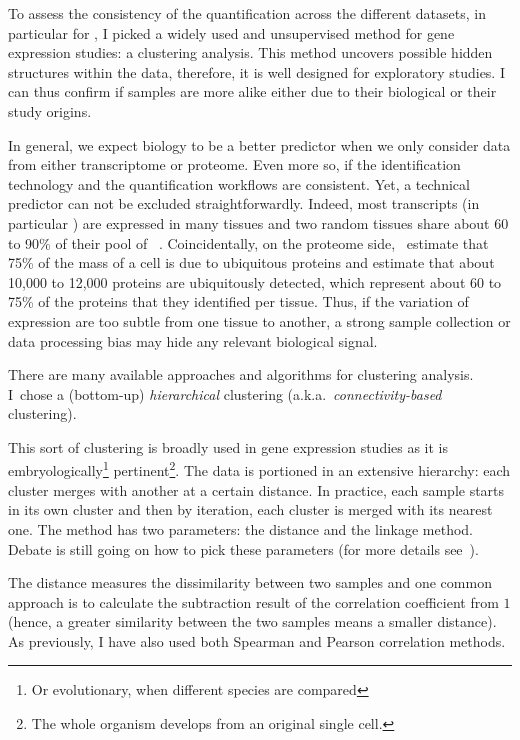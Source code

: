 To assess the consistency of the quantification across the different datasets,
in particular for \Rnaseq,
I picked a widely used and unsupervised method for gene expression studies:
a clustering analysis.
This method uncovers possible hidden
structures within the data, therefore,
it is well designed for exploratory studies.
I can thus confirm if samples are more alike either due to their
biological or their study origins.

In general, we expect biology to be a better predictor when we only consider
data from either transcriptome or proteome. Even more so, if the
identification technology and the quantification workflows are
consistent. Yet, a technical predictor can not be excluded straightforwardly.
Indeed, most transcripts (in particular \mRNAs) are expressed in many tissues
and two random tissues share about 60 to 90\% of their pool of
\mRNAs~.
Coincidentally, on the proteome side,~\cite{PandeyData}
estimate that 75\% of the mass of a cell is due to ubiquitous proteins and
\cite{KusterData} estimate that about 10,000
to 12,000 proteins are ubiquitously detected, which represent about 60 to 75\%
of the proteins that they identified per tissue. Thus, if the variation of
expression are too subtle from one tissue to another, a strong sample collection
or data processing bias may hide any relevant biological signal.

There are many available approaches and algorithms for clustering analysis.
I~chose a (bottom-up) \emph{hierarchical} clustering (a.k.a.\
\emph{connectivity-based} clustering).

This sort of clustering is broadly used in gene expression studies as it is
embryologically\footnote{Or evolutionary, when different species are compared}
pertinent\footnote{The whole organism develops from
an original single cell.}. The data is portioned in an extensive hierarchy:
each cluster merges with another at a certain distance.
In practice, each sample starts in its own cluster and then
by iteration, each cluster is merged with its nearest one.
The method has two parameters: the distance and the linkage method.
Debate is still going on how to pick these parameters (for more details
see~\mycite{Jaskowiak2014}).

The distance measures the dissimilarity between two samples and one common
approach is to calculate the subtraction result of
the correlation coefficient from $1$ (hence, a greater similarity between the two
samples means a smaller distance). As previously, I have also used both Spearman
and Pearson correlation methods.

